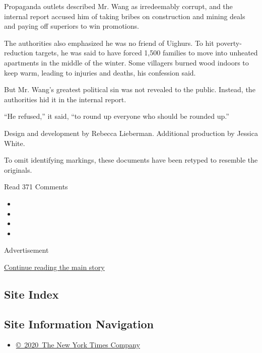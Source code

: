 Propaganda outlets described Mr. Wang as irredeemably corrupt, and the
internal report accused him of taking bribes on construction and mining
deals and paying off superiors to win promotions.

The authorities also emphasized he was no friend of Uighurs. To hit
poverty-reduction targets, he was said to have forced 1,500 families to
move into unheated apartments in the middle of the winter. Some
villagers burned wood indoors to keep warm, leading to injuries and
deaths, his confession said.

But Mr. Wang's greatest political sin was not revealed to the public.
Instead, the authorities hid it in the internal report.

``He refused,'' it said, ``to round up everyone who should be rounded
up.''

Design and development by Rebecca Lieberman. Additional production by
Jessica White.

To omit identifying markings, these documents have been retyped to
resemble the originals.

Read 371 Comments

\begin{itemize}
\item
\item
\item
\item
\end{itemize}

Advertisement

\protect\hyperlink{after-bottom}{Continue reading the main story}

\hypertarget{site-index}{%
\subsection{Site Index}\label{site-index}}

\hypertarget{site-information-navigation}{%
\subsection{Site Information
Navigation}\label{site-information-navigation}}

\begin{itemize}
\tightlist
\item
  \href{https://help.nytimes3xbfgragh.onion/hc/en-us/articles/115014792127-Copyright-notice}{©~2020~The
  New York Times Company}
\end{itemize}

